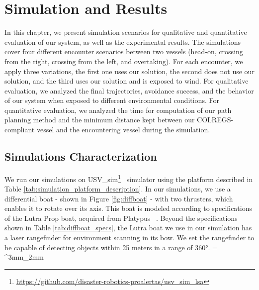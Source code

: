 \chapter{Simulation and Results}
\label{chap:5_Simulation_And_Results}
        
    In this chapter, we present simulation scenarios for qualitative and quantitative evaluation of our system, as well as the experimental results. The simulations cover four different encounter scenarios between two vessels (head-on, crossing from the right, crossing from the left, and overtaking). For each encounter, we apply three variations, the first one uses our solution, the second does not use our solution, and the third uses our solution and is exposed to wind. For qualitative evaluation, we analyzed the final trajectories, avoidance success, and the behavior of our system when exposed to different environmental conditions. For quantitative evaluation, we analyzed the time for computation of our path planning method and the minimum distance kept between our \ac{COLREGS}-compliant vessel and the encountering vessel during the simulation.

    \section{Simulations Characterization}
    
    We run our simulations on USV\_sim\footnote{\url{https://github.com/disaster-robotics-proalertas/usv\_sim\_lsa}}~\cite{Paravisi2018Toward} simulator using the platform described in Table \ref{tab:simulation_platform_description}. In our simulations, we use a differential boat - shown in Figure \ref{fig:diffboat} - with two thrusters, which enables it to rotate over its axis. This boat is modeled according to specifications of the Lutra Prop boat, acquired from Platypus ~\cite{PlatypusLLC}. Beyond the specifications shown in Table \ref{tab:diffboat_specs}, the Lutra boat we use in our simulation has a laser rangefinder for environment scanning in its bow. We set the rangefinder to be capable of detecting objects within 25 meters in a range of 360°.
    \tabulinesep = ^3mm_2mm
    \everyrow{\tabucline[.4mm  white]{}}

